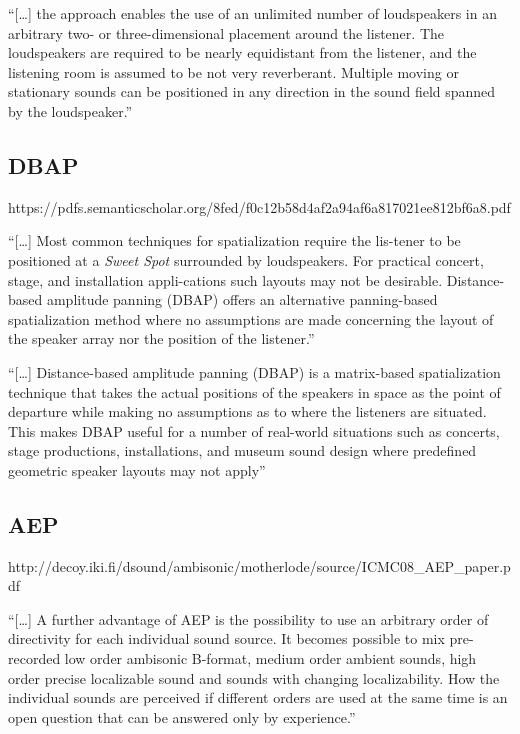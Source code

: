 \documentclass[
  letterpaper,
  DIV=11,
  numbers=noendperiod]{scrreport}
\begin{document}
``{[}\ldots{]} the approach enables the use of an unlimited number of
loudspeakers in an arbitrary two- or three-dimensional placement around
the listener. The loudspeakers are required to be nearly equidistant
from the listener, and the listening room is assumed to be not very
reverberant. Multiple moving or stationary sounds can be positioned in
any direction in the sound field spanned by the loudspeaker.''

\hypertarget{dbap}{%
\subsection{DBAP}\label{dbap}}

https://pdfs.semanticscholar.org/8fed/f0c12b58d4af2a94af6a817021ee812bf6a8.pdf

``{[}\ldots{]} Most common techniques for spatialization require the
lis-tener to be positioned at a \emph{Sweet Spot} surrounded by
loudspeakers. For practical concert, stage, and installation
appli-cations such layouts may not be desirable. Distance-based
amplitude panning (DBAP) offers an alternative panning-based
spatialization method where no assumptions are made concerning the
layout of the speaker array nor the position of the listener.''

``{[}\ldots{]} Distance-based amplitude panning (DBAP) is a matrix-based
spatialization technique that takes the actual positions of the speakers
in space as the point of departure while making no assumptions as to
where the listeners are situated. This makes DBAP useful for a number of
real-world situations such as concerts, stage productions,
installations, and museum sound design where predefined geometric
speaker layouts may not apply''

\hypertarget{aep}{%
\subsection{AEP}\label{aep}}

http://decoy.iki.fi/dsound/ambisonic/motherlode/source/ICMC08\_AEP\_paper.pdf

``{[}\ldots{]} A further advantage of AEP is the possibility to use an
arbitrary order of directivity for each individual sound source. It
becomes possible to mix pre-recorded low order ambisonic B-format,
medium order ambient sounds, high order precise localizable sound and
sounds with changing localizability. How the individual sounds are
perceived if different orders are used at the same time is an open
question that can be answered only by experience.''
\end{document}
